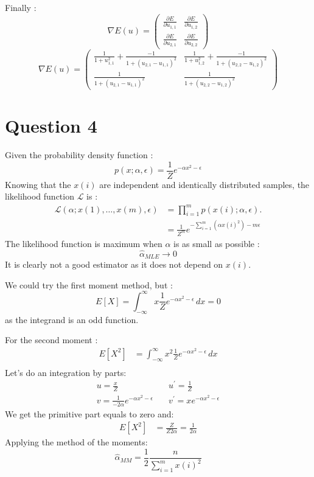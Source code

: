 \documentclass{article}
\begin{document}
Finally :\\
\[
\nabla E(u) = \begin{pmatrix}
  \frac{\partial E}{\partial u_{1,1}} &
  \frac{\partial E}{\partial u_{1,2}} \\
  \frac{\partial E}{\partial u_{2,1}} &
  \frac{\partial E}{\partial u_{2,2}}
\end{pmatrix}
\]
\[
\boxed{
\nabla E(u) =
\begin{pmatrix}
 \frac{1}{1+u_{1,1}^2}  + \frac{-1}{1+(u_{2,1}-u_{1,1})^2} &
  \frac{1}{1+u_{1,2}^2}  + \frac{-1}{1+(u_{2,2}-u_{1,2})^2} \\
  \frac{1}{1+(u_{2,1}-u_{1,1})^2} &
  \frac{1}{1+(u_{2,2}-u_{1,2})^2}
\end{pmatrix}
}
\]

\section{Question 4}
Given the probability density function :\\
\[
p(x; \alpha, \epsilon) = \frac{1}{Z} e^{-\alpha x^2 - \epsilon}
\]
Knowing that the $x(i)$ are independent and identically distributed samples, the likelihood function $\mathcal{L}$ is :\\
\begin{align*}
\mathcal{L}(\alpha; x(1), \ldots, x(m),\epsilon) &= \prod_{i=1}^{m} p(x(i); \alpha, \epsilon).\\
&=\frac{1}{Z^m} e^{-\sum_{i=1}^m(\alpha x(i)^2) - m \epsilon}
\end{align*}
The likelihood function is maximum when $\alpha$ is as small as possible :
\[
\boxed{
\hat{\alpha}_{MLE} \xrightarrow{} 0
}
\]
It is clearly not a good estimator as it does not depend on $x(i)$.

We could try the first moment method, but :
\[
E[X] = \int_{-\infty}^{\infty} x \frac{1}{Z} e^{-\alpha x^2 - \epsilon} \, dx =0
\]
as the integrand is an odd function.

For the second moment :
\begin{align*}
E[X^2] &= \int_{-\infty}^{\infty} x^2 \frac{1}{Z} e^{-\alpha x^2 - \epsilon} \, dx \\
\end{align*}
Let's do an integration by parts:
\begin{align*}
u=\frac{x}{Z} &\quad u^\prime=\frac{1}{Z} \\
v=\frac{1}{-2\alpha}e^{-\alpha x^2 -\epsilon} &\quad v^\prime=xe^{-\alpha x^2 -\epsilon}
\end{align*}
We get the primitive part equals to zero and:
\begin{align*}
E[X^2] &= \frac{Z}{Z2\alpha}=\frac{1}{2\alpha}
\end{align*}
Applying the method of the moments:
\[
\boxed{
\hat{\alpha}_{MM}=\frac{1}{2}\frac{n}{\sum_{i=1}^m x(i)^2}
}
\]
\end{document}
